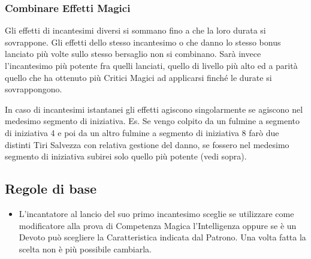 \begin{multicols}{2}
\subsubsection{Combinare Effetti Magici}\label{magiecombinareeffettimagici}

Gli effetti di incantesimi diversi si sommano fino a che la loro durata si sovrappone. Gli effetti dello stesso incantesimo o che danno lo stesso bonus lanciato più volte sullo stesso bersaglio non si combinano. Sarà invece l'incantesimo più potente fra quelli lanciati, quello di livello più alto ed a parità quello che ha ottenuto più Critici Magici ad applicarsi finché le durate si sovrappongono.

In caso di incantesimi istantanei gli effetti agiscono singolarmente se agiscono nel medesimo segmento di iniziativa. Es. Se vengo colpito da un fulmine a segmento di iniziativa 4 e poi da un altro fulmine a segmento di iniziativa 8 farò due distinti Tiri Salvezza con relativa gestione del danno, se fossero nel medesimo segmento di iniziativa subirei solo quello più potente (vedi sopra).


\subsection{Regole di base}\label{magieregoledibase}

\begin{itemize}[leftmargin=*] \setlength{\itemsep}{0pt}

\item
L'incantatore al lancio del suo primo incantesimo sceglie se utilizzare come modificatore alla prova di Competenza Magica l'Intelligenza oppure se è un Devoto può scegliere la Caratteristica indicata dal Patrono. Una volta fatta la scelta non è più possibile cambiarla.


\end{itemize}
\end{multicols}
